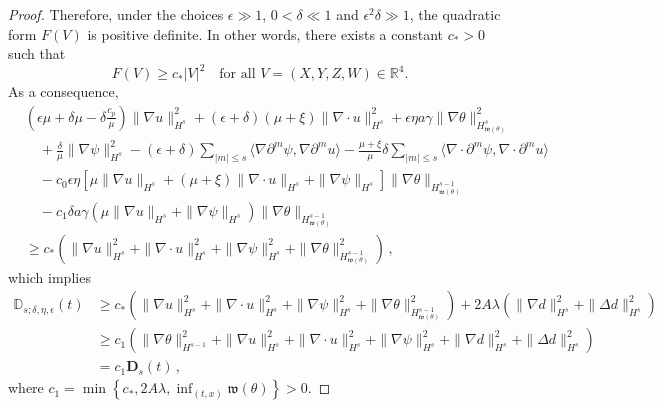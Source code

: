 \documentclass[reqno,11pt]{amsart}
\numberwithin{equation}{section}
\def\w{\mathfrak{w}}
\begin{document}
\begin{proof}
Therefore, under the choices $\epsilon \gg 1$, $0 < \delta \ll 1$ and $\epsilon^2 \delta \gg 1$, the quadratic form $F(V)$ is positive definite. In other words, there exists a constant $c_* > 0$ such that
\[
F(V) \geq c_* |V|^2 \quad \text{for all } V = (X,Y,Z,W) \in \mathbb{R}^4.
\]
As a consequence,
\begin{equation}\label{close-eq12}
\begin{aligned}
& (\epsilon \mu + \delta \mu  - \delta \frac{c_p}{\mu} ) \|\nabla u\|_{H^s}^2 + (\epsilon + \delta) (\mu + \xi ) \|\nabla \cdot u\|_{H^s}^2 + \epsilon \eta a \gamma \|\nabla \theta\|_{H_{ \w (\theta) }^s }^2 \\
& \quad + \frac{\delta}{\mu} \| \nabla \psi\|_{H^s}^2 - (\epsilon + \delta) \sum_{|m| \leq s} \langle \nabla \partial^m \psi, \nabla \partial^m u \rangle - \frac{\mu + \xi}{\mu} \delta \sum_{|m| \leq s} \langle \nabla \cdot \partial^m \psi, \nabla \cdot \partial^m u \rangle \\
& \quad - c_0 \epsilon \eta [ \mu \| \nabla u \|_{H^s} + (\mu + \xi) \| \nabla \cdot u \|_{H^s} + \| \nabla \psi \|_{H^s} ] \| \nabla \theta \|_{ H^{s-1}_{ \w (\theta) } } \\
& \quad - c_1 \delta a \gamma ( \mu \| \nabla u \|_{H^s} + \| \nabla \psi \|_{H^s} ) \| \nabla \theta \|_{ H^{s-1}_{ \w (\theta) } } \\
& \geq c_*(\|\nabla u\|^2_{H^s}+\|\nabla\cdot u\|^2_{H^s}+\|\nabla \psi\|^2_{H^s} + \| \nabla \theta \|_{ H^{s-1}_{ \w (\theta) } }^2) \,,
\end{aligned}
\end{equation}
which implies 
\begin{equation*}
\begin{aligned}
\mathbb{D}_{s;\delta,\eta, \epsilon}(t)
&\geq c_*(\|\nabla u\|^2_{H^s}+\|\nabla\cdot u\|^2_{H^s}+\|\nabla \psi\|^2_{H^s} + \| \nabla \theta \|_{ H^{s-1}_{ \w (\theta) } }^2) + 2A\lambda \left( \|\nabla d\|_{H^{s}}^{2} + \|\Delta d\|_{H^{s}}^{2} \right)\\&
\geq c_{1} \left( \|\nabla \theta\|_{H^{s-1}}^{2} + \|\nabla u\|_{H^{s}}^{2} + \|\nabla \cdot u\|_{H^{s}}^{2} + \|\nabla \psi\|_{H^{s}}^{2} + \|\nabla d\|_{H^{s}}^{2} + \|\Delta d\|_{H^{s}}^{2} \right)
\\&=c_1\mathbf{D}_s(t) \,,
\end{aligned}
\end{equation*}
where $c_1= \min\left\{ c_{*} , 2A \lambda, \inf_{(t,x)} \w (\theta) \right\} > 0$. 



\end{proof}
\end{document}
